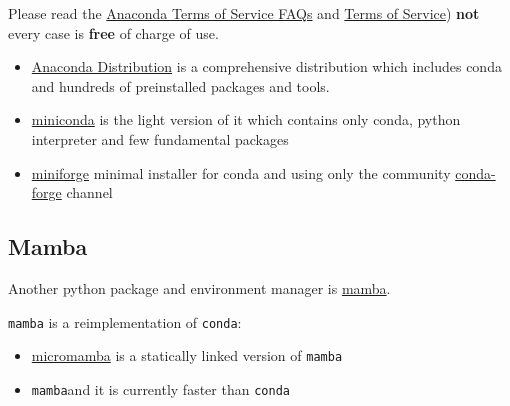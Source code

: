 \documentclass[
  letterpaper,
  DIV=11,
  numbers=noendperiod]{scrreprt}
\providecommand{\tightlist}{%
  \setlength{\itemsep}{0pt}\setlength{\parskip}{0pt}}\usepackage{longtable,booktabs,array}
\begin{document}
\begin{tcolorbox}[enhanced jigsaw, leftrule=.75mm, bottomrule=.15mm, colbacktitle=quarto-callout-warning-color!10!white, title=\textcolor{quarto-callout-warning-color}{\faExclamationTriangle}\hspace{0.5em}{Warning}, breakable, arc=.35mm, toptitle=1mm, opacityback=0, titlerule=0mm, coltitle=black, colback=white, opacitybacktitle=0.6, colframe=quarto-callout-warning-color-frame, left=2mm, rightrule=.15mm, toprule=.15mm, bottomtitle=1mm]

Please read the
\href{https://www.anaconda.com/pricing/terms-of-service-faqs}{Anaconda
Terms of Service FAQs} and
\href{https://legal.anaconda.com/policies/en/}{Terms of Service})
\textbf{not} every case is \textbf{free} of charge of use.

\end{tcolorbox}

\begin{itemize}
\tightlist
\item
  \href{https://docs.anaconda.com/anaconda/install/}{Anaconda
  Distribution} is a comprehensive distribution which includes conda and
  hundreds of preinstalled packages and tools.
\item
  \href{https://docs.anaconda.com/free/miniconda/index.html}{miniconda}
  is the light version of it which contains only conda, python
  interpreter and few fundamental packages
\item
  \href{https://github.com/conda-forge/miniforge}{miniforge} minimal
  installer for conda and using only the community
  \href{https://conda-forge.org/}{conda-forge} channel
\end{itemize}

\subsection*{Mamba}\label{mamba}

Another python package and environment manager is
\href{https://mamba.readthedocs.io/en/latest/index.html}{mamba}.

\texttt{mamba} is a reimplementation of \texttt{conda}:

\begin{itemize}
\tightlist
\item
  \href{https://mamba.readthedocs.io/en/latest/installation/micromamba-installation.html}{micromamba}
  is a statically linked version of \texttt{mamba}
\item
  \texttt{mamba}and it is currently faster than \texttt{conda}
\end{itemize}
\end{document}
